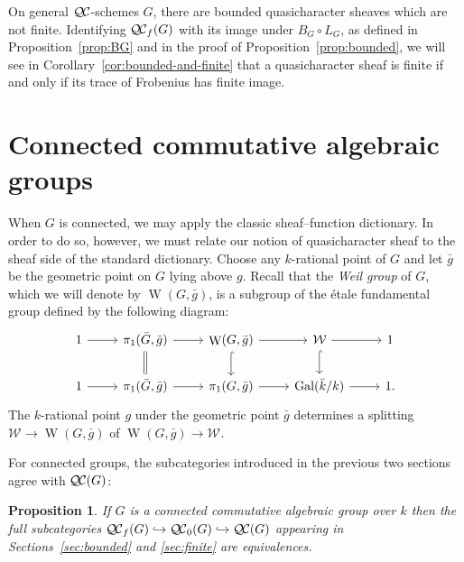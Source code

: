 \documentclass[11pt]{amsart}
\theoremstyle{plain}
\newtheorem{proposition}[theorem]{Proposition}
\theoremstyle{definition}
\theoremstyle{remark}
\newcommand{\bFq}{\bar{k}}
\newcommand{\Fq}{k}
\DeclareMathOperator{\Gal}{Gal}
\DeclareMathOperator{\W}{W}
\newcommand{\QC}{{\mathcal{Q\hskip-0.8pt C}}}
\newcommand{\QCb}{{\QC_0}}
\newcommand{\QCf}{{\QC_f}}
\newcommand{\Weil}[1]{\mathcal{W}_{#1}}
\newcommand{\bg}{\bar{g}}
\newcommand{\bG}{\bar{G}}
\begin{document}
On general $\QC$-schemes $G$, there are bounded quasicharacter sheaves which are not finite.  Identifying
$\QCf(G)$ with its image under $B_G \circ L_G$, as defined in Proposition~\ref{prop:BG} and in the proof of Proposition~\ref{prop:bounded}, we will see in Corollary~\ref{cor:bounded-and-finite} that
a quasicharacter sheaf is finite if and only if its trace of Frobenius has finite image.
 
\section{Connected commutative algebraic groups} \label{sec:connected}

When $G$ is connected, we may apply the classic sheaf--function dictionary.  In order to do so,
however, we must relate our notion of quasicharacter sheaf to the sheaf side of the standard dictionary.
Choose any $\Fq$-rational point of $G$ and let $\bg$ be the geometric point on $G$ lying above $g$.
Recall that the \emph{Weil group} of $G$, which we will denote by $\W(G,\bg)$, is a subgroup of the \'etale
fundamental group defined by the following diagram:
\[
 \begin{tikzcd}
 1 \rar & \ar[equal]{d} \pi_1(\bG, \bg) \rar & \W(G,\bg) \rar \dar[hook] & \Weil{} \rar \dar[hook] & 1 \\
 1 \rar &  \pi_1(\bG, \bg) \rar & \pi_1(G,\bg) \rar & \Gal(\bFq/\Fq) \rar & 1.
 \end{tikzcd}
\]
The $\Fq$-rational point $g$ under the geometric point $\bg$ determines a splitting
$\Weil{}\to \W(G,\bg)$ of $\W(G,\bg)\to \Weil{}$. 

For connected groups, the subcategories introduced in the previous two sections agree with $\QC(G)$:

\begin{proposition}\label{prop:connected}
  If $G$ is a connected commutative algebraic group over $\Fq$ then 
  the full subcategories $\QCf(G) \hookrightarrow \QCb(G) \hookrightarrow \QC(G)$ 
  appearing in Sections~\ref{sec:bounded} and \ref{sec:finite} are equivalences.
\end{proposition}
\end{document}

